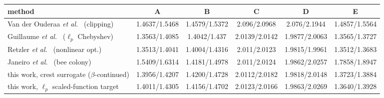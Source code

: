 \begin{tabular}{l c c c c c}
method & A & B & C & D & E \\
\hline
Van der Ouderaa \emph{et al.}~\cite{vanderouderaa1988peak} (clipping) & 1.4637/1.5468 & 1.4579/1.5372 & 2.096/2.0968 & 2.076/2.1944 & 1.4857/1.5564 \\
Guillaume \emph{et al.}~\cite{guillaume1991crest} ($\ell_p$ Chebyshev) & 1.3563/1.4085 & 1.4042/1.437 & 2.0139/2.0142 & 1.9877/2.0063 & 1.3565/1.3727 \\
Retzler \emph{et al.}~\cite{retzler2022crest} (nonlinear opt.) & 1.3513/1.4041 & 1.4004/1.4316 & 2.011/2.0123 & 1.9815/1.9961 & 1.3512/1.3683 \\
Janeiro \emph{et al.}~\cite{janeiro2020abc} (bee colony) & 1.5409/1.6314 & 1.4181/1.4978 & 2.011/2.0124 & 1.9862/2.0257 & 1.7858/1.8947 \\
\hline
this work, crest surrogate ($\beta$-continued) & 1.3956/1.4207 & 1.4200/1.4728 & 2.0112/2.0182 & 1.9818/2.0148 & 1.3723/1.3884 \\
this work, $\ell_p$ scaled-function target & 1.4011/1.4305 & 1.4156/1.4702 & 2.0123/2.0166 & 1.9863/2.0269 & 1.3640/1.3928 \\
\end{tabular}
